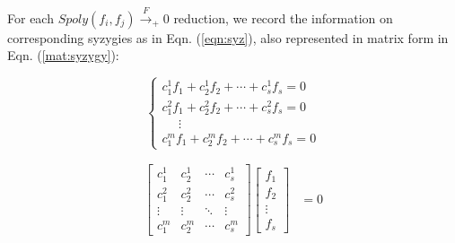 For each $Spoly(f_i,f_j)\xrightarrow{F}_+0$ reduction, we record the
information on corresponding syzygies as in Eqn. (\ref{eqn:syz}), also
represented in matrix form in Eqn. (\ref{mat:syzygy}):


\begin{equation} \label{eqn:syz}
 \begin{cases}
 c_1^1f_1+c_2^1f_2+\cdots+c_s^1f_s = 0\\
 c_1^2f_1+c_2^2f_2+\cdots+c_s^2f_s  = 0\\
 \ \ \ \ \ \  \vdots \\
 c_1^mf_1+c_2^mf_2+\cdots+c_s^mf_s = 0  
 \end{cases}
\end{equation}

\begin{center}
\begin{align}
\label{mat:syzygy}
   \begin{bmatrix}
           c_1^1 & c_2^1 & \cdots & c_s^1 \\
           c_1^2 & c_2^2 & \cdots & c_s^2 \\
           \vdots & \vdots & \ddots & \vdots \\
           c_1^m & c_2^m & \cdots & c_s^m
         \end{bmatrix}
    \begin{bmatrix}
           f_{1} \\
           f_{2} \\
           \vdots \\
           f_{s}
         \end{bmatrix}
         &= 0
  \end{align}

\end{center}


